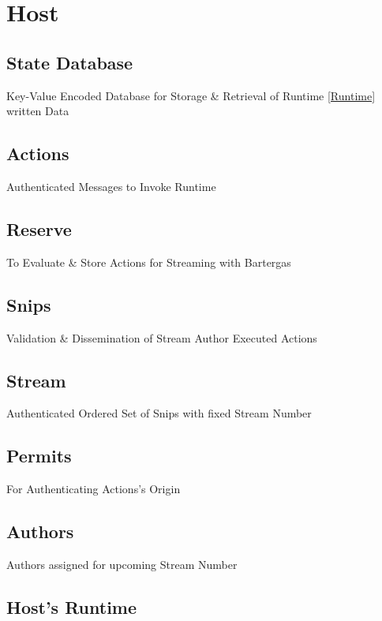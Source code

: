 \documentclass[../alan-handbook.tex]{subfiles}
\begin{document}
\section{Host} \label{Host}

\subsection{State Database} \label{StateDatabase}

Key-Value Encoded Database for Storage \& Retrieval of Runtime \ref{Runtime} written Data

\subsection{Actions} \label{Actions} 

Authenticated Messages to Invoke Runtime 

\subsection{Reserve} \label{Reserve} 

To Evaluate \& Store Actions for Streaming with Bartergas

\subsection{Snips} \label{Snips}

Validation \& Dissemination of Stream Author Executed Actions

\subsection{Stream} \label{Stream}

Authenticated Ordered Set of Snips with fixed Stream Number

\subsection{Permits} \label{Permits}

For Authenticating Actions's Origin

\subsection{Authors} \label{Authors}

Authors assigned for upcoming Stream Number

\subsection{Host's Runtime} \label{HostRuntime}
\end{document}
